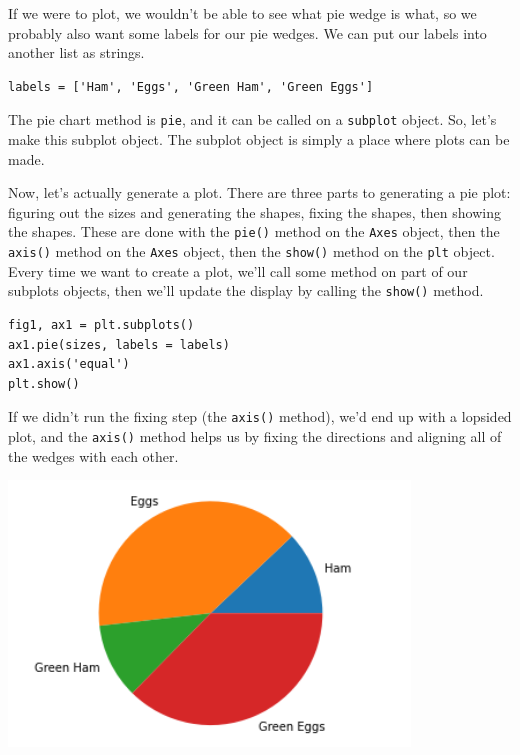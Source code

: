 If we were to plot, we wouldn't be able to see what pie wedge is what, so we probably also want some labels for our pie wedges. We can put our labels into another list as strings.\par
\begin{lstlisting}[style=pippython]
labels = ['Ham', 'Eggs', 'Green Ham', 'Green Eggs']
\end{lstlisting}
The pie chart method is \verb|pie|, and it can be called on a \verb|subplot| object. So, let's make this subplot object. The subplot object is simply a place where plots can be made.\par
Now, let's actually generate a plot. There are three parts to generating a pie plot: figuring out the sizes and generating the shapes, fixing the shapes, then showing the shapes. These are done with the \verb|pie()| method on the \verb|Axes| object, then the \verb|axis()| method on the \verb|Axes| object, then the \verb|show()| method on the \verb|plt| object. Every time we want to create a plot, we'll call some method on part of our subplots objects, then we'll update the display by calling the \verb|show()| method.\par
\begin{lstlisting}[style=pippython]
fig1, ax1 = plt.subplots()
ax1.pie(sizes, labels = labels)
ax1.axis('equal')
plt.show()
\end{lstlisting}
If we didn't run the fixing step (the \verb|axis()| method), we'd end up with a lopsided plot, and the \verb|axis()| method helps us by fixing the directions and aligning all of the wedges with each other.\par

\includegraphics[width=0.8\textwidth]{img/pie1.png}

